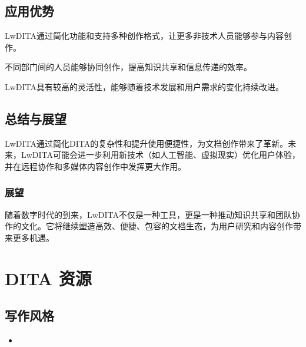 \documentclass[letterpaper,10pt,english]{sphinxmanual}
\begin{document}
\section{应用优势}
\label{\detokenize{dita/lightweight-dita:id6}}
\sphinxAtStartPar
LwDITA通过简化功能和支持多种创作格式，让更多非技术人员能够参与内容创作。

\sphinxAtStartPar
不同部门间的人员能够协同创作，提高知识共享和信息传递的效率。

\sphinxAtStartPar
LwDITA具有较高的灵活性，能够随着技术发展和用户需求的变化持续改进。


\section{总结与展望}
\label{\detokenize{dita/lightweight-dita:id7}}
\sphinxAtStartPar
LwDITA通过简化DITA的复杂性和提升使用便捷性，为文档创作带来了革新。未来，LwDITA可能会进一步利用新技术（如人工智能、虚拟现实）优化用户体验，并在远程协作和多媒体内容创作中发挥更大作用。


\subsection{展望}
\label{\detokenize{dita/lightweight-dita:id8}}
\sphinxAtStartPar
随着数字时代的到来，LwDITA不仅是一种工具，更是一种推动知识共享和团队协作的文化。它将继续塑造高效、便捷、包容的文档生态，为用户研究和内容创作带来更多机遇。

\sphinxstepscope


\chapter{DITA 资源}
\label{\detokenize{dita/dita_resources:dita}}\label{\detokenize{dita/dita_resources::doc}}

\section{写作风格}
\label{\detokenize{dita/dita_resources:id1}}\begin{itemize}
\item {} 
\sphinxAtStartPar
{}

\end{itemize}
\end{document}
